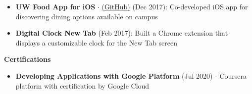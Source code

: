 \documentclass[10pt,a4paper]{article}
\newcommand{\sectionheading}[1]{
  \vspace{14pt}
  \textbf{\Large #1}
  \vspace{6pt}
}
\newcommand{\listitem}[1]{
  \item #1 \vspace{-5pt}
}
\begin{document}
\begin{minipage}[t]{.4\textwidth}
  \begin{itemize}
    \listitem{\textbf{UW Food App for iOS} $\cdot$ \href{https://github.com/naruthk/mobile-uw-food-app}{(GitHub)} (Dec 2017): Co-developed iOS app for discovering dining options available on campus}
  \end{itemize}

  \begin{itemize}
    \listitem{\textbf{Digital Clock New Tab} (Feb 2017): Built a Chrome extension that displays a customizable clock for the New Tab screen}
  \end{itemize}

  \sectionheading{Certifications}

  \begin{itemize}
    \listitem{\textbf{Developing Applications with Google Platform} (Jul 2020) - Coursera platform with certification by Google Cloud}
  \end{itemize}

\end{minipage}
\hfill
%
%
\end{document}
